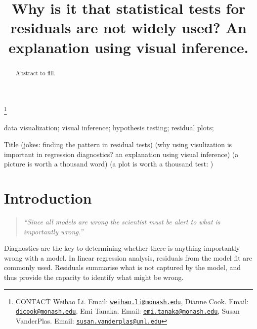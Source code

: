 \documentclass[]{interact}
\theoremstyle{plain}%
\theoremstyle{definition}
\theoremstyle{remark}
\begin{document}

\title{Why is it that statistical tests for residuals are not widely
used? An explanation using visual inference.}


\author{
}

\thanks{CONTACT Weihao
Li. Email: \href{mailto:weihao.li@monash.edu}{\nolinkurl{weihao.li@monash.edu}}, Dianne
Cook. Email: \href{mailto:dicook@monash.edu}{\nolinkurl{dicook@monash.edu}}, Emi
Tanaka. Email: \href{mailto:emi.tanaka@monash.edu}{\nolinkurl{emi.tanaka@monash.edu}}, Susan
VanderPlas. Email: \href{mailto:susan.vanderplas@unl.edu}{\nolinkurl{susan.vanderplas@unl.edu}}}

\maketitle

\begin{abstract}
Abstract to fill.
\end{abstract}

\begin{keywords}
data visualization; visual inference; hypothesis testing; residual
plots;
\end{keywords}

Title (jokes: finding the pattern in residual tests) (why using
visulization is important in regression diagnostics? an explanation
using visual inference) (a picture is worth a thousand word) (a plot is
worth a thousand test: )

\hypertarget{introduction}{%
\section{Introduction}\label{introduction}}

\begin{quote}
\emph{``Since all models are wrong the scientist must be alert to what
is importantly wrong.''} \citep{box1976science}
\end{quote}

Diagnostics are the key to determining whether there is anything
importantly wrong with a model. In linear regression analysis, residuals
from the model fit are commonly used. Residuals summarise what is not
captured by the model, and thus provide the capacity to identify what
might be wrong.
\end{document}

